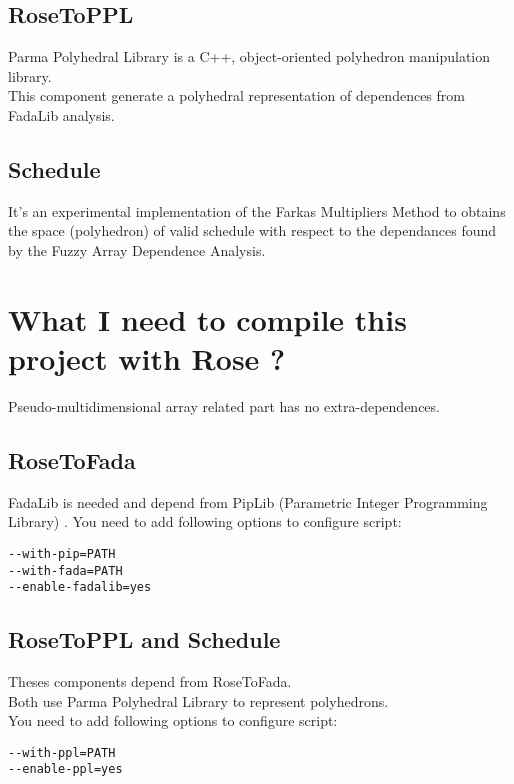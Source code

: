 		\subsection{RoseToPPL}
		
	Parma Polyhedral Library \cite{PPL} is a C++, object-oriented polyhedron manipulation library.\\
	This component generate a polyhedral representation of dependences from FadaLib analysis.
	
		\subsection{Schedule}
		
	It's an experimental implementation of the Farkas Multipliers Method to obtains the space (polyhedron) of 
valid schedule with respect to the dependances found by the Fuzzy Array Dependence Analysis.

	\section{What I need to compile this project with Rose ?}

	Pseudo-multidimensional array related part has no extra-dependences.
	
		\subsection{RoseToFada}
	
	FadaLib \cite{FADAweb} is needed and depend from PipLib (Parametric Integer Programming Library)
\cite{PIP}.
	You need to add following options to configure script:
\begin{verbatim}
--with-pip=PATH
--with-fada=PATH
--enable-fadalib=yes
\end{verbatim}
	
		\subsection{RoseToPPL and Schedule}

	Theses components depend from RoseToFada.\\
	Both use Parma Polyhedral Library \cite{PPL} to represent polyhedrons.\\
	You need to add following options to configure script:
\begin{verbatim}
--with-ppl=PATH
--enable-ppl=yes
\end{verbatim}
		

